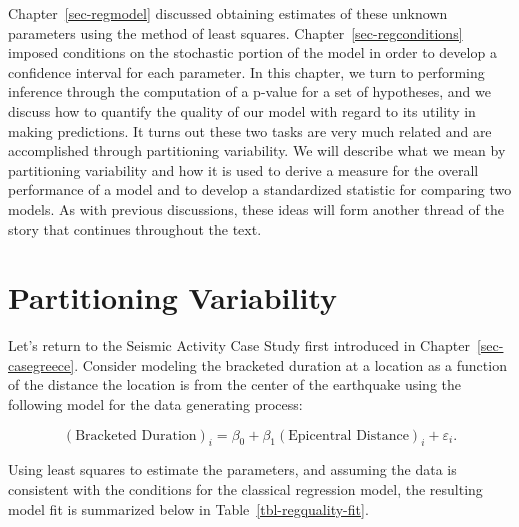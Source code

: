 \documentclass[
  letterpaper,
  DIV=11,
  numbers=noendperiod]{scrreprt}
\theoremstyle{plain}
\theoremstyle{definition}
\theoremstyle{definition}
\theoremstyle{remark}
\begin{document}
Chapter~\ref{sec-regmodel} discussed obtaining estimates of these
unknown parameters using the method of least squares.
Chapter~\ref{sec-regconditions} imposed conditions on the stochastic
portion of the model in order to develop a confidence interval for each
parameter. In this chapter, we turn to performing inference through the
computation of a p-value for a set of hypotheses, and we discuss how to
quantify the quality of our model with regard to its utility in making
predictions. It turns out these two tasks are very much related and are
accomplished through partitioning variability. We will describe what we
mean by partitioning variability and how it is used to derive a measure
for the overall performance of a model and to develop a standardized
statistic for comparing two models. As with previous discussions, these
ideas will form another thread of the story that continues throughout
the text.

\section{Partitioning Variability}\label{partitioning-variability}

Let's return to the Seismic Activity Case Study first introduced in
Chapter~\ref{sec-casegreece}. Consider modeling the bracketed duration
at a location as a function of the distance the location is from the
center of the earthquake using the following model for the data
generating process:

\[(\text{Bracketed Duration})_i = \beta_0 + \beta_1(\text{Epicentral Distance})_i + \varepsilon_i.\]

Using least squares to estimate the parameters, and assuming the data is
consistent with the conditions for the classical regression model, the
resulting model fit is summarized below in
Table~\ref{tbl-regquality-fit}.

\begin{table}

\caption{\label{tbl-regquality-fit}Summary of the model fit explaining
the bracketed duration as a function of epicentral distance.}


\end{table}%
\end{document}
